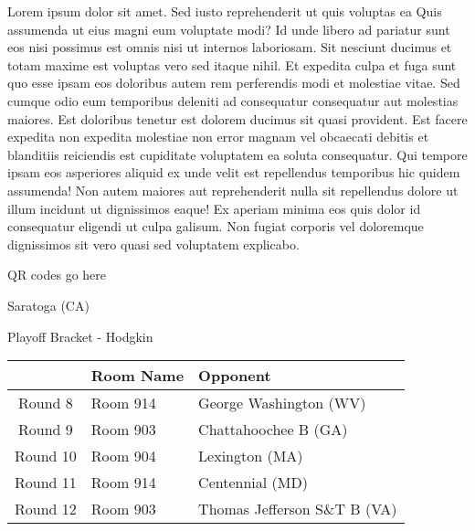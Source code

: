 \documentclass{article}%
\begin{document}
\vspace*{8pt}%
\linebreak%
\newline%
\newline%
Lorem ipsum dolor sit amet. Sed iusto reprehenderit ut quis voluptas ea Quis assumenda ut eius magni eum voluptate modi? Id unde libero ad pariatur sunt eos nisi possimus est omnis nisi ut internos laboriosam. Sit nesciunt ducimus et totam maxime est voluptas vero sed itaque nihil. Et expedita culpa et fuga sunt quo esse ipsam eos doloribus autem rem perferendis modi et molestiae vitae.\newline%
\newline%
Sed cumque odio eum temporibus deleniti ad consequatur consequatur aut molestias maiores. Est doloribus tenetur est dolorem ducimus sit quasi provident. Est facere expedita non expedita molestiae non error magnam vel obcaecati debitis et blanditiis reiciendis est cupiditate voluptatem ea soluta consequatur. Qui tempore ipsam eos asperiores aliquid ex unde velit est repellendus temporibus hic quidem assumenda!\newline%
\newline%
Non autem maiores aut reprehenderit nulla sit repellendus dolore ut illum incidunt ut dignissimos eaque! Ex aperiam minima eos quis dolor id consequatur eligendi ut culpa galisum. Non fugiat corporis vel doloremque dignissimos sit vero quasi sed voluptatem explicabo.\newline%
\newline%
%
\vspace*{30pt}%
\begin{center}%
\begin{Huge}%
QR codes go here%
\end{Huge}%
\end{center}%
\newpage%
\begin{center}%
\begin{Huge}%
Saratoga (CA)%
\end{Huge}%
\vspace*{8pt}%
\linebreak%
\begin{Large}%
Playoff Bracket {-} Hodgkin%
\end{Large}%
\end{center}%
%
\begin{tabularx}{\textwidth}{|c|Y|Y|}%
\hline%
&Room Name&Opponent\\%
\hline%
Round 8&Room 914&George Washington (WV)\\%
Round 9&Room 903&Chattahoochee B (GA)\\%
Round 10&Room 904&Lexington (MA)\\%
Round 11&Room 914&Centennial (MD)\\%
Round 12&Room 903&Thomas Jefferson S\&T B (VA)\\%
\hline%
\end{tabularx}%
\end{document}
